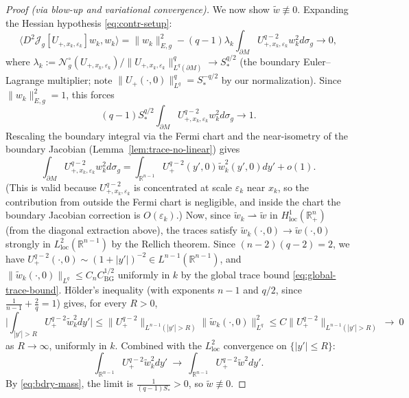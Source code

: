 \documentclass[11pt,reqno,a4paper]{amsart}
\newcommand{\R}{\mathbb{R}}
\numberwithin{equation}{section}
\theoremstyle{plain}
\theoremstyle{remark}
\theoremstyle{plain}
\begin{document}
\begin{proof}[Proof (via blow-up and variational convergence)]
We now show $\widetilde w\not\equiv0$.
Expanding the Hessian hypothesis \eqref{eq:contr-setup}:
\[
\big\langle D^2\mathcal J_g[U_{+,x_k,\varepsilon_k}]w_k,w_k\big\rangle
= \|w_k\|_{E,g}^2
   - (q-1)\lambda_k\int_{\partial M}U_{+,x_k,\varepsilon_k}^{q-2}w_k^2d\sigma_g
\to 0,
\]
where $\lambda_k:=\mathcal N^\circ_g(U_{+,x_k,\varepsilon_k})/\|U_{+,x_k,\varepsilon_k}\|_{L^q(\partial M)}^q\to S_\ast^{q/2}$
(the boundary Euler--Lagrange multiplier; note $\|U_+(\cdot,0)\|_{L^q}^q=S_\ast^{-q/2}$ by our normalization).
Since $\|w_k\|_{E,g}^2=1$, this forces
\begin{equation}\label{eq:bdry-mass}
(q-1)S_\ast^{q/2}\int_{\partial M}U_{+,x_k,\varepsilon_k}^{q-2}w_k^2d\sigma_g
\longrightarrow 1.
\end{equation}
Rescaling the boundary integral via the Fermi chart and
the near-isometry of the boundary Jacobian
(Lemma~\ref{lem:trace-no-linear}) gives
\[
\int_{\partial M}U_{+,x_k,\varepsilon_k}^{q-2}w_k^2d\sigma_g
=\int_{\R^{n-1}}U_+^{q-2}(y',0)
\widetilde w_k^2(y',0)dy'+o(1).
\]
(This is valid because $U_{+,x_k,\varepsilon_k}^{q-2}$
is concentrated at scale $\varepsilon_k$ near $x_k$,
so the contribution from outside the Fermi chart is negligible,
and inside the chart the boundary Jacobian correction is
$O(\varepsilon_k)$.)
Now, since $\widetilde w_k\rightharpoonup\widetilde w$ in
$H^1_{\mathrm{loc}}(\R^n_+)$ (from the diagonal extraction above), the traces satisfy
$\widetilde w_k(\cdot,0)\to\widetilde w(\cdot,0)$
strongly in $L^2_{\mathrm{loc}}(\R^{n-1})$ by the Rellich theorem.
Since $(n-2)(q-2)=2$, we have
$U_+^{q-2}(\cdot,0)\sim(1+|y'|)^{-2}\in L^{n-1}(\R^{n-1})$,
and $\|\widetilde w_k(\cdot,0)\|_{L^q}\le C_nC_{\mathrm{BG}}^{1/2}$
uniformly in $k$ by the global trace bound \eqref{eq:global-trace-bound}.
H\"older's inequality (with exponents $n-1$ and $q/2$,
since $\frac1{n-1}+\frac2q=1$) gives, for every $R>0$,
\[
\bigg|\int_{|y'|>R}U_+^{q-2}\widetilde w_k^2dy'\bigg|
\le \|U_+^{q-2}\|_{L^{n-1}(|y'|>R)}
     \|\widetilde w_k(\cdot,0)\|_{L^q}^2
\le C\|U_+^{q-2}\|_{L^{n-1}(|y'|>R)}\ \to\ 0
\]
as $R\to\infty$,
uniformly in $k$.
Combined with the $L^2_{\mathrm{loc}}$ convergence on $\{|y'|\le R\}$:
\[
\int_{\R^{n-1}}U_+^{q-2}\widetilde w_k^2dy'
\ \longrightarrow\
\int_{\R^{n-1}}U_+^{q-2}\widetilde w^2dy'.
\]
By \eqref{eq:bdry-mass}, the limit is
$\frac{1}{(q-1)S_\ast}>0$, so $\widetilde w\not\equiv0$.


\end{proof}
\end{document}
